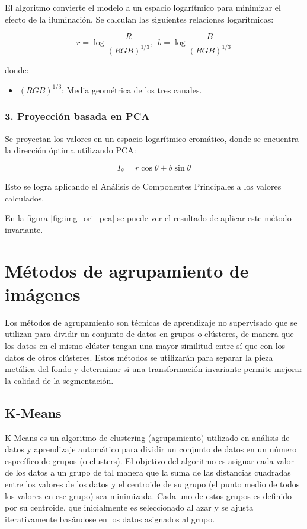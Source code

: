 El algoritmo convierte el modelo a un espacio logarítmico para minimizar el efecto de la iluminación. Se calculan las siguientes relaciones logarítmicas:

$$r=\log \frac{R}{(RGB)^{1/3} },~~b=\log \frac{B}{(RGB)^{1/3} }$$

donde:

\begin{itemize}
\setlength{\itemsep}{-1ex}
   \item{\begin{flushleft} $(RGB)^{1/3}$: Media geométrica de los tres canales. \end{flushleft}}
\end{itemize}

\subsubsection{3. Proyección basada en PCA}

Se proyectan los valores en un espacio logarítmico-cromático, donde se encuentra la dirección óptima utilizando PCA:

$$I_{\theta } =r\cos \theta +b\sin \theta$$

Esto se logra aplicando el Análisis de Componentes Principales a los valores calculados.

En la figura \ref{fig:img_ori_pca} se puede ver el resultado de aplicar este método invariante.

\section{Métodos de agrupamiento de imágenes}\label{metodos-de-agrupamiento-de-imagenes}

Los métodos de agrupamiento son técnicas de aprendizaje no supervisado que se utilizan para dividir un conjunto de datos en grupos o clústeres, de manera que los datos en el mismo clúster tengan una mayor similitud entre sí que con los datos de otros clústeres. Estos métodos se utilizarán para separar la pieza metálica del fondo y determinar si una transformación invariante permite mejorar la calidad de la segmentación.

\subsection{K-Means}\label{k-means}

K-Means \cite{MATLAB:2023bKmeans} es un algoritmo de clustering (agrupamiento) utilizado en análisis de datos y aprendizaje automático para dividir un conjunto de datos en un número específico de grupos (o clusters). El objetivo del algoritmo es asignar cada valor de los datos a un grupo de tal manera que la suma de las distancias cuadradas entre los valores de los datos y el centroide de su grupo (el punto medio de todos los valores en ese grupo) sea minimizada. Cada uno de estos grupos es definido por su centroide, que inicialmente es seleccionado al azar y se ajusta iterativamente basándose en los datos asignados al grupo.

